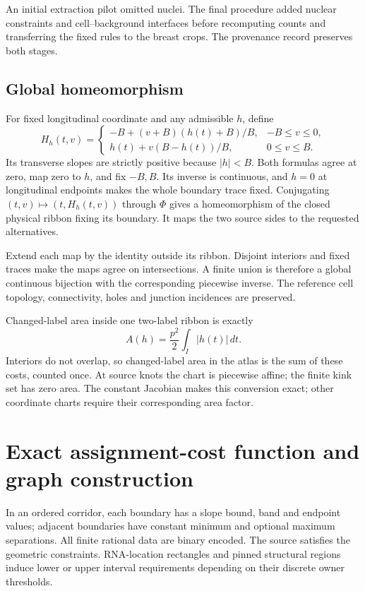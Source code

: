 \documentclass[10pt,letterpaper]{article}
\begin{document}
An initial extraction pilot omitted nuclei. The final procedure added nuclear constraints and cell--background interfaces before recomputing counts and transferring the fixed rules to the breast crops. The provenance record preserves both stages.

\FloatBarrier
\subsection{Global homeomorphism}
For fixed longitudinal coordinate and any admissible $h$, define
\[
 H_h(t,v)=\begin{cases}
 -B+(v+B)(h(t)+B)/B,&-B\le v\le0,\\
 h(t)+v(B-h(t))/B,&0\le v\le B.
 \end{cases}
\]
Its transverse slopes are strictly positive because $|h|<B$. Both formulas agree at zero, map zero to $h$, and fix $-B,B$. Its inverse is continuous, and $h=0$ at longitudinal endpoints makes the whole boundary trace fixed. Conjugating $(t,v)\mapsto(t,H_h(t,v))$ through $\Phi$ gives a homeomorphism of the closed physical ribbon fixing its boundary. It maps the two source sides to the requested alternatives.

Extend each map by the identity outside its ribbon. Disjoint interiors and fixed traces make the maps agree on intersections. A finite union is therefore a global continuous bijection with the corresponding piecewise inverse. The reference cell topology, connectivity, holes and junction incidences are preserved.

Changed-label area inside one two-label ribbon is exactly
\[
 A(h)=\frac{p^2}{2}\int_I |h(t)|\,dt.
\]
Interiors do not overlap, so changed-label area in the atlas is the sum of these costs, counted once. At source knots the chart is piecewise affine; the finite kink set has zero area. The constant Jacobian makes this conversion exact; other coordinate charts require their corresponding area factor.

\section{Exact assignment-cost function and graph construction}
In an ordered corridor, each boundary has a slope bound, band and endpoint values; adjacent boundaries have constant minimum and optional maximum separations. All finite rational data are binary encoded. The source satisfies the geometric constraints. RNA-location rectangles and pinned structural regions induce lower or upper interval requirements depending on their discrete owner thresholds.
\end{document}
